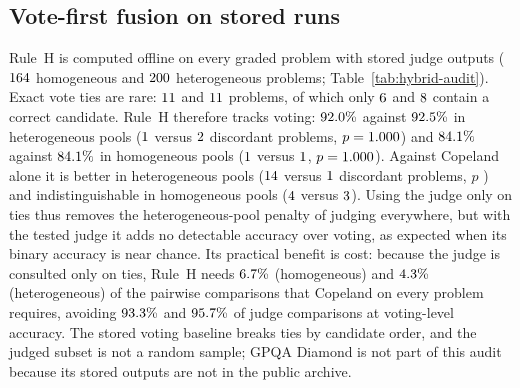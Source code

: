\documentclass[preprint,11pt,number,sort&compress]{elsarticle}
\begin{document}
\subsection{Vote-first fusion on stored runs}
\label{sec:hybrid-results}

Rule~H is computed offline on every graded problem with stored judge outputs
($164$ homogeneous and $200$ heterogeneous problems; Table~\ref{tab:hybrid-audit}).
Exact vote ties are rare: $11$ and $11$ problems, of which only
$6$ and $8$ contain a correct candidate. Rule~H therefore tracks voting:
$92.0\%$ against $92.5\%$ in heterogeneous pools ($1$ versus $2$ discordant
problems, $p=1.000$) and $84.1\%$ against $84.1\%$ in homogeneous pools
($1$ versus $1$, $p=1.000$). Against Copeland alone it is better in heterogeneous
pools ($14$ versus $1$ discordant problems, $p$ \HybHetPCop) and indistinguishable
in homogeneous pools ($4$ versus $3$). Using the judge only on ties thus removes
the heterogeneous-pool penalty of judging everywhere, but with the tested judge it adds no
detectable accuracy over voting, as expected when its binary accuracy is near chance. Its practical
benefit is cost: because the judge is consulted only on ties, Rule~H needs $6.7\%$
(homogeneous) and $4.3\%$ (heterogeneous) of the pairwise comparisons that Copeland on
every problem requires, avoiding $93.3\%$ and $95.7\%$ of judge comparisons at
voting-level accuracy. The stored
voting baseline breaks ties by candidate order, and the judged subset is not a random sample;
GPQA Diamond is not part of this audit because its stored outputs are not in the public archive.
\end{document}

